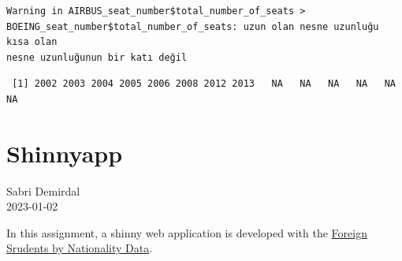 \documentclass[
  letterpaper,
  DIV=11,
  numbers=noendperiod]{scrreprt}
\newenvironment{Shaded}{\begin{snugshade}}{\end{snugshade}}
\newcommand{\AttributeTok}[1]{\textcolor[rgb]{0.40,0.45,0.13}{#1}}
\newcommand{\FunctionTok}[1]{\textcolor[rgb]{0.28,0.35,0.67}{#1}}
\newcommand{\NormalTok}[1]{\textcolor[rgb]{0.00,0.23,0.31}{#1}}
\newcommand{\OtherTok}[1]{\textcolor[rgb]{0.00,0.23,0.31}{#1}}
\newcommand{\SpecialCharTok}[1]{\textcolor[rgb]{0.37,0.37,0.37}{#1}}
\newcommand{\StringTok}[1]{\textcolor[rgb]{0.13,0.47,0.30}{#1}}
\begin{document}
\begin{Shaded}
\end{Shaded}

\begin{verbatim}
Warning in AIRBUS_seat_number$total_number_of_seats >
BOEING_seat_number$total_number_of_seats: uzun olan nesne uzunluğu kısa olan
nesne uzunluğunun bir katı değil
\end{verbatim}

\begin{verbatim}
 [1] 2002 2003 2004 2005 2006 2008 2012 2013   NA   NA   NA   NA   NA   NA
\end{verbatim}


\hypertarget{shinnyapp}{%
\chapter{Shinnyapp}\label{shinnyapp}}

Sabri Demirdal\\
2023-01-02

\hfill\break

In this assignment, a shinny web application is developed with the
\href{https://github.com/berkorbay/datasets/raw/master/foreign_students/foreign_students_by_nationality_2021_2022.xlsx}{Foreign
Srudents by Nationality Data}.
\end{document}
